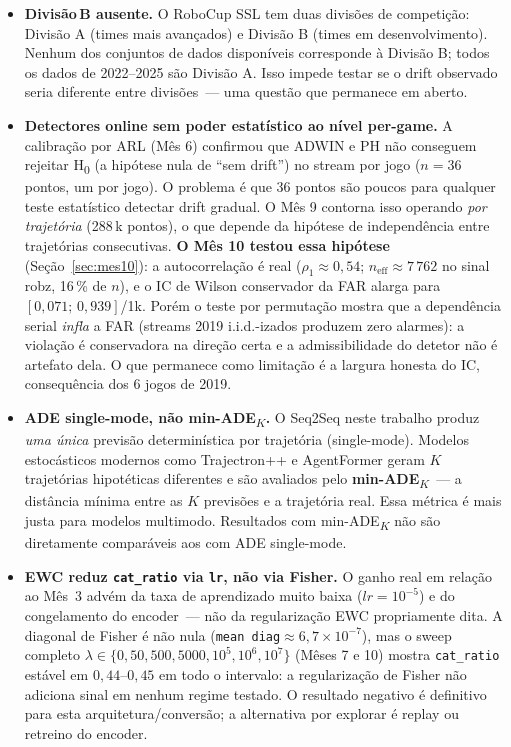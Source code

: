 \documentclass[11pt,a4paper]{article}
\begin{document}
\begin{itemize}[leftmargin=1.4em,itemsep=4pt]
    \item \textbf{Divis\~ao\,B ausente.} O RoboCup SSL tem duas divis\~oes de competi\c{c}\~ao: Divis\~ao A (times mais avan\c{c}ados) e Divis\~ao B (times em desenvolvimento). Nenhum dos conjuntos de dados dispon\'iveis corresponde \`a Divis\~ao B; todos os dados de 2022--2025 s\~ao Divis\~ao A. Isso impede testar se o drift observado seria diferente entre divis\~oes~--- uma quest\~ao que permanece em aberto.

    \item \textbf{Detectores online sem poder estat\'istico ao n\'ivel per-game.} A calibra\c{c}\~ao por ARL (M\^es 6) confirmou que ADWIN e PH n\~ao conseguem rejeitar H\textsubscript{0} (a hip\'otese nula de ``sem drift'') no stream por jogo ($n{=}36$ pontos, um por jogo). O problema \'e que 36 pontos s\~ao poucos para qualquer teste estat\'istico detectar drift gradual. O M\^es 9 contorna isso operando \emph{por trajet\'oria} (288\,k pontos), o que depende da hip\'otese de independ\^encia entre trajet\'orias consecutivas. \textbf{O M\^es 10 testou essa hip\'otese} (Se\c{c}\~ao~\ref{sec:mes10}): a autocorrela\c{c}\~ao \'e real ($\rho_1\!\approx\!0{,}54$; $n_\text{eff}\!\approx\!7\,762$ no sinal robz, 16\,\% de $n$), e o IC de Wilson conservador da FAR alarga para $[0{,}071;\,0{,}939]$/1k. Por\'em o teste por permuta\c{c}\~ao mostra que a depend\^encia serial \emph{infla} a FAR (streams 2019 i.i.d.-izados produzem zero alarmes): a viola\c{c}\~ao \'e conservadora na dire\c{c}\~ao certa e a admissibilidade do detetor n\~ao \'e artefato dela. O que permanece como limita\c{c}\~ao \'e a largura honesta do IC, consequ\^encia dos 6 jogos de 2019.

    \item \textbf{ADE single-mode, n\~ao min-ADE\textsubscript{$K$}.} O Seq2Seq neste trabalho produz \emph{uma \'unica} previs\~ao determin\'istica por trajet\'oria (single-mode). Modelos estoc\'asticos modernos como Trajectron++ \cite{salzmann2020} e AgentFormer \cite{yuan2021} geram $K$ trajet\'orias hipot\'eticas diferentes e s\~ao avaliados pelo \textbf{min-ADE\textsubscript{$K$}}~--- a dist\^ancia m\'inima entre as $K$ previs\~oes e a trajet\'oria real. Essa m\'etrica \'e mais justa para modelos multimodo. Resultados com min-ADE\textsubscript{$K$} n\~ao s\~ao diretamente compar\'aveis aos com ADE single-mode.

    \item \textbf{EWC reduz \texttt{cat\_ratio} via \texttt{lr}, n\~ao via Fisher.} O ganho real em rela\c{c}\~ao ao M\^es~3 adv\'em da taxa de aprendizado muito baixa ($lr\!=\!10^{-5}$) e do congelamento do encoder~--- n\~ao da regulariza\c{c}\~ao EWC propriamente dita. A diagonal de Fisher \'e n\~ao nula (\texttt{mean diag}$\approx 6{,}7\!\times\!10^{-7}$), mas o sweep completo $\lambda\!\in\!\{0, 50, 500, 5000, 10^5, 10^6, 10^7\}$ (M\^eses 7 e 10) mostra \texttt{cat\_ratio} est\'avel em $0{,}44$--$0{,}45$ em todo o intervalo: a regulariza\c{c}\~ao de Fisher n\~ao adiciona sinal em nenhum regime testado. O resultado negativo \'e definitivo para esta arquitetura/convers\~ao; a alternativa por explorar \'e replay ou retreino do encoder.


\end{itemize}
\end{document}
